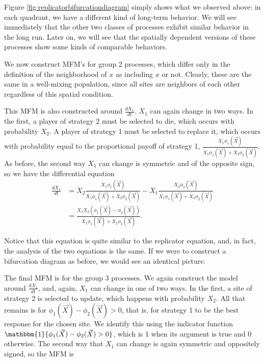 \documentclass[notitlepage,reqno]{amsart}
\begin{document}
Figure \ref{fig:replicatorbifurcationdiagram} simply shows what we
observed above: in each quadrant, we have a different kind of
long-term behavior. We will see immediately that the other two classes
of processes exhibit similar behavior in the long run. Later on, we will
see that the spatially dependent versions of these processes show some
kinds of comparable behaviors.

We now construct MFM's for group 2 processes, which differ only in
the definition of the neighborhood of $x$ as including $x$ or
not. Clearly, these are the same in a well-mixing population, since
all sites are neighbors of each other regardless of this spatial condition.

This MFM is also constructed around $\frac{d X_1}{dt}$. $X_1$ can
again change in two ways. In the first, a player of strategy 2
must be selected to die, which occurs with probability
$X_2$. A player of strategy 1 must be selected to replace it,
which occurs with probability equal to the proportional payoff of
strategy 1, $\frac{X_1\phi_1(\vec{X})}{X_1\phi_1(\vec{X}) +
  X_2\phi_2(\vec{X})}$. As before, the second way $X_1$ can change is
symmetric and of the opposite sign, so we have the differential
equation
\begin{align*}
  \frac{d X_1}{dt} &= X_2 \frac{X_1\phi_1(\vec{X})}{X_1\phi_1(\vec{X}) +
  X_2\phi_2(\vec{X})} - X_1 \frac{X_2\phi_2(\vec{X})}{X_1\phi_1(\vec{X}) +
  X_2\phi_2(\vec{X})} \\
  &= \frac{X_1 X_2 \left( \phi_1(\vec{X}) -
      \phi_2(\vec{X})\right)}{X_1\phi_1(\vec{X}) + X_2\phi_2(\vec{X})}.
\end{align*}

Notice that this equation is quite similar to the replicator equation,
and, in fact, the analysis of the two equations is the same. If we
were to construct a bifurcation diagram as before, we would see an
identical picture.

The final MFM is for the group 3 processes. We again construct the model around $\frac{d X_1}{dt}$,
and, again, $X_1$ can change in one of two ways. In the first, a site
of strategy 2 is selected to update, which happens with probability
$X_2$. All that remains is for $\phi_1(\vec{X})-\phi_2(\vec{X}) > 0$,
that is, for strategy 1 to be the best response for the chosen
site. We identify this using the indicator function
$\mathbbm{1}\{\phi_1(\vec{X})-\phi_2(\vec{X}) > 0\}$, which is 1 when
its argument is true and 0 otherwise. The second way that $X_1$ can
change is again symmetric and oppositely signed, so the MFM is
\end{document}
